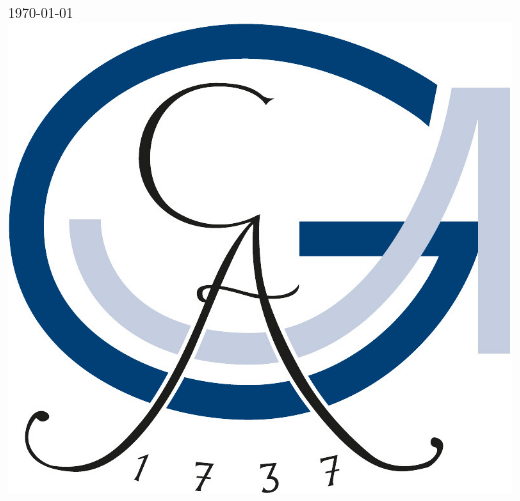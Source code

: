 \begin{titlepage}


{\large \today}\\[2cm] %


\includegraphics{logo_1.jpg}\\[1cm] %


\vfill %

\end{titlepage}
\vfill
\newpage
\thispagestyle{empty}
\newpage
\tableofcontents
\newpage

